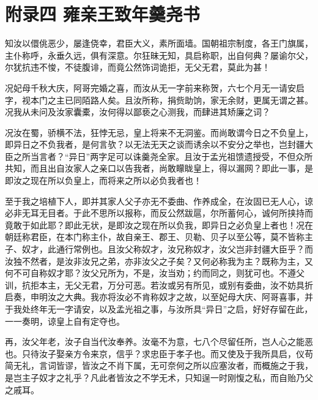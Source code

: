 \chapter*{附录四 雍亲王致年羹尧书}

知汝以儇佻恶少，屡逢侥幸，君臣大义，素所面墙。国朝祖宗制度，各王门旗属，主仆称呼，永垂久远，俱有深意。尔狂昧无知，具启称职，出自何典？屡谕尔父，尔犹抗违不悛，不徒腹诽，而竟公然饰词诡拒，无父无君，莫此为甚！



况妃母千秋大庆，阿哥完婚之喜，而汝从无一字前来称贺，六七个月无一请安启字，视本门之主已同陌路人矣。且汝所称，捐赀助饷，家无余财，更属无谓之甚。况我从未问及汝家囊橐，汝何得以鄙亵之心测我，而肆进其矫廉之词？



况汝在蜀，骄横不法，狂悖无忌，皇上将来不无洞鉴。而尚敢谓今日之不负皇上，即异日之不负我者，是何言欤？以无法无天之谈而诱余以不安分之举也，岂封疆大臣之所当言者？“异日”两字足可以诛羹尧全家。且汝于孟光祖馈遗授受，不但众所共知，而且出自汝家人之亲口以告我者，尚敢矇眬皇上，得以漏网？即此一事，是即汝之现在所以负皇上，而将来之所以必负我者也！



至于我之培植下人，即并其家人父子亦无不委曲、作养成全，在汝固已无人心，谅必非无耳无目者。于此不思所以报称，而反公然跋扈，尔所蓄何心，诚何所挟持而竟敢于如此耶？即此无状，是即汝之现在所以负我，即异日之必负皇上者也！况在朝廷称君臣，在本门称主仆，故自亲王、郡王、贝勒、贝子以至公等，莫不皆称主子、奴才，此通行常例也。且汝父称奴才，汝兄称奴才，汝父岂非封疆大臣乎？而汝独不然者，是汝非汝兄之弟，亦非汝父之子矣？又何必称我为主？既称为主，又何不可自称奴才耶？汝父兄所为，不是，汝当劝；约而同之，则犹可也。不遵父训，抗拒本主，无父无君，万分可恶。若汝或另有所见，或别有委曲，汝不妨具折启奏，申明汝之大典。我亦将汝必不肯称奴才之故，以至妃母大庆、阿哥喜事，并于我处终年无一字请安，以及孟光祖之事，与汝所具“异日”之启，好好存留在此，一一奏明，谅皇上自有定夺也。



再，汝父年老，汝子自当代汝奉养。汝毫不为意，七八个尽留任所，岂人心之能恶也。只待汝子娶亲方令来京，信乎？求忠臣于孝子也。而又使及于我所具启，仪苟简无礼，言词皆谬，皆汝之不肖下属，无可奈何之所以应塞汝者，而概施之于我，是岂主子奴才之礼乎？凡此者皆汝之不学无术，只知逞一时刚愎之私，而自贻乃父之戚耳。



